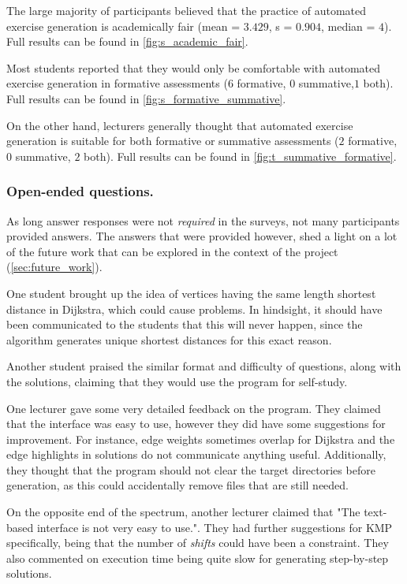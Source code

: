\documentclass{l4proj}
\begin{document}
The large majority of participants believed that the practice of automated exercise generation is academically fair (mean = $3.429$, s = $0.904$, median = $4$). Full results can be found in \autoref{fig:s_academic_fair}.

Most students reported that they would only be comfortable with automated exercise generation in formative assessments ($6$ formative, $0$ summative,$1$ both).  Full results can be found in \autoref{fig:s_formative_summative}.

On the other hand, lecturers generally thought that automated exercise generation is suitable for both formative or summative assessments ($2$ formative, $0$ summative, $2$ both).  Full results can be found in \autoref{fig:t_summative_formative}.

\subsubsection{Open-ended questions.}

As long answer responses were not \emph{required} in the surveys, not many participants provided answers. The answers that were provided however, shed a light on a lot of the future work that can be explored in the context of the project (\autoref{sec:future_work}).

One student brought up the idea of vertices having the same length shortest distance in Dijkstra, which could cause problems. In hindsight, it should have been communicated to the students that this will never happen, since the algorithm generates unique shortest distances for this exact reason. 

Another student praised the similar format and difficulty of questions, along with the solutions, claiming that they would use the program for self-study.

One lecturer gave some very detailed feedback on the program. They claimed that the interface was easy to use, however they did have some suggestions for improvement. For instance, edge weights sometimes overlap for Dijkstra and the edge highlights in solutions do not communicate anything useful. Additionally, they thought that the program should not clear the target directories before generation, as this could accidentally remove files that are still needed.

On the opposite end of the spectrum, another lecturer claimed that "The text-based interface is not very easy to use.". They had further suggestions for KMP specifically, being that the number of \emph{shifts} could have been a constraint. They also commented on execution time being quite slow for generating step-by-step solutions.
\end{document}
